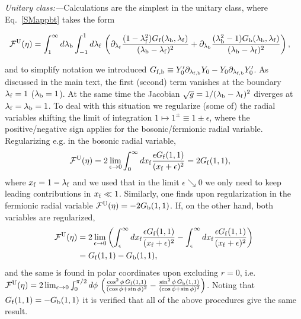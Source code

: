 \documentclass[twocolumn,showpacs,aps,prl]{revtex4}
\begin{document}
{\it Unitary class:---}Calculations are the simplest in the unitary class, 
where Eq.~\eqref{SMappbt} takes the form
\begin{widetext}
\begin{align}
{\cal F}^{\rm U}(\eta)
&=
\int_1^\infty d\lambda_{\rm b}
\int_{-1}^{1} d\lambda_{\rm f}\,
\left(
\partial_{\lambda_{\rm f}}  
{(1-\lambda_{\rm f}^2)G_{\rm f}(\lambda_{\rm b},\lambda_{\rm f})\over (\lambda_{\rm b}-\lambda_{\rm f})^2}
+
\partial_{\lambda_{\rm b}} 
{(\lambda_{\rm b}^2-1) G_{\rm b}(\lambda_{\rm b},\lambda_{\rm f}) \over (\lambda_{\rm b}-\lambda_{\rm f})^2}
\right),
\end{align}
\end{widetext}
and to simplify notation we introduced 
$G_{\rm f,b}
\equiv
Y_0' 
\partial_{\lambda_{\rm f,b}}   Y_0
-
Y_0 
\partial_{\lambda_{\rm f,b}}   Y_0'$. 
As discussed in the main text, the first (second) term vanishes 
at the boundary $\lambda_{\rm f}=1$ 
($\lambda_{\rm b}=1$). At the same time the Jacobian 
$\sqrt{g}=1/(\lambda_{\rm b}-\lambda_{\rm f})^2$
diverges at $\lambda_{\rm f}=\lambda_{\rm b}=1$.
To deal with this situation we regularize (some of) the radial variables shifting the 
limit of integration $1\mapsto 1^\pm\equiv 1\pm \epsilon$,
where the positive/negative sign applies for the bosonic/fermionic radial variable. 
Regularizing e.g. in the bosonic radial variable,
\begin{align}
{\cal F}^{\rm U}(\eta)
&=
2\lim_{\epsilon\to0}
\int_0^\infty 
dx_{\rm f}
{\epsilon G_{\rm f}(1, 1)
\over 
(x_{\rm f} +\epsilon)^2}
=
2G_{\rm f}(1, 1),
\end{align}
where $x_{\rm f}=1-\lambda_{\rm f}$
and we  used that in the limit $\epsilon\searrow 0$
we only 
need to keep leading contributions in $x_{\rm f}\ll1$. 
Similarly,  one finds upon
regularization in the fermionic radial variable
${\cal F}^{\rm U}(\eta)=-2G_{\rm b}(1, 1)$.
If, on the other hand, both variables are regularized,
\begin{align}
{\cal F}^{\rm U}(\eta)
&=
2\lim_{\epsilon\to0}
\left(
\int_\epsilon^\infty 
dx_{\rm f}
{\epsilon G_{\rm f}(1, 1)
\over 
(x_{\rm f} +\epsilon)^2}
-
\int_\epsilon^\infty 
dx_{\rm f}
{\epsilon G_{\rm f}(1, 1)
\over 
(x_{\rm f} +\epsilon)^2}
\right)
\nonumber\\
&
=
G_{\rm f}(1, 1)
-
G_{\rm b}(1, 1),
\end{align}
and the same is found 
in polar coordinates upon excluding $r=0$, 
i.e.
${\cal F}^{\rm U}(\eta)=
2\lim_{\epsilon\to0}
\int_0^{\pi/2} d\phi\,
\left(
{\cos^2\phi \, G_{\rm f}(1,1)\over(\cos\phi+\sin\phi)^2}
-
{\sin^2\phi \, G_{\rm b}(1,1)\over(\cos\phi+\sin\phi)^2}
\right)$.
Noting that
$G_{\rm f}(1,1)=-G_{\rm b}(1,1)$ 
it is verified that all of the above procedures give the same result. 
\end{document}
